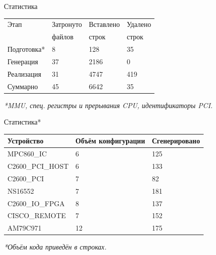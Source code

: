 \documentclass[unicode,hyperref={unicode=true}]{beamer}
\theoremstyle{definition}
\theoremstyle{plain}
\begin{document}
\begin{frame}{Статистика}
\begin{center}
\begin{tabular}{l|lll}
Этап         & Затронуто & Вставлено & Удалено \\
             & файлов    & строк     & строк   \\
\hline
Подготовка*  & 8         & 128       & 35      \\
Генерация    & 37        & 2186      & 0       \\
Реализация   & 31        & 4747      & 419     \\
Суммарно     & 45        & 6642      & 35      \\
\end{tabular}
\end{center}
\vfill
\it{*MMU, спец. регистры и прерывания CPU, идентификаторы PCI.}
\end{frame}



\begin{frame}{Статистика*}
\begin{center}
\begin{tabular}{l|ll}
Устройство        & Объём конфигурации & Сгенерировано \\
\hline
MPC860\_IC        & 6                  & 125           \\
C2600\_PCI\_HOST  & 6                  & 133           \\
C2600\_PCI        & 7                  & 82            \\
NS16552           & 7                  & 181           \\
C2600\_IO\_FPGA   & 8                  & 137           \\
CISCO\_REMOTE     & 7                  & 152           \\
AM79C971          & 12                 & 175           \\
\end{tabular}
\end{center}
\vfill
\it{*Объём кода приведён в строках.}
\end{frame}
\end{document}
